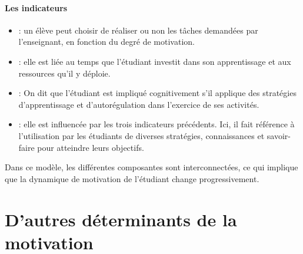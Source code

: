        \paragraph{Les indicateurs}
            \begin{itemize}\myItemStyle
            \item {}: un élève peut choisir de réaliser ou non les tâches demandées par l'enseignant, en fonction du degré de motivation.
            \item {}: elle est liée au temps que l'étudiant investit dans son apprentissage et aux ressources qu'il y déploie.
            \item {}: On dit que l'étudiant est impliqué cognitivement s'il applique des stratégies d'apprentissage et d'autorégulation dans l'exercice de ses activités.
            \item {}: elle est influencée par les trois indicateurs précédents. Ici, il fait référence à l'utilisation par les étudiants de diverses stratégies, connaissances et savoir-faire pour atteindre leurs objectifs.
            \end{itemize}\par%
        Dans ce modèle, les différentes composantes sont interconnectées, ce qui implique que la dynamique de motivation de l'étudiant change progressivement.
\section{D'autres déterminants de la motivation}
